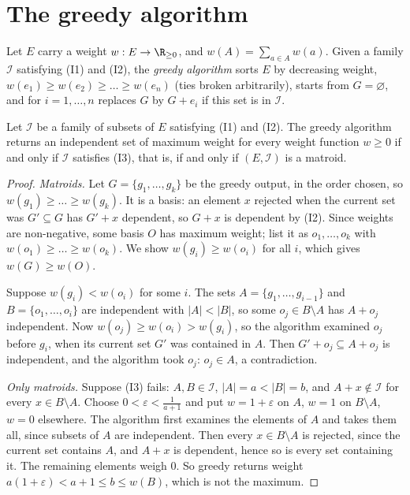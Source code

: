 \section{The greedy algorithm}

Let $E$ carry a weight $w:E\to\R_{\ge0}$, and $w(A)=\sum_{a\in A}w(a)$. Given a family $\mathcal I$ satisfying (I1) and (I2), the \emph{greedy algorithm} sorts $E$ by decreasing weight,
$w(e_1)\ge w(e_2)\ge\dots\ge w(e_n)$ (ties broken arbitrarily), starts from $G=\varnothing$, and for $i=1,\dots,n$ replaces $G$ by $G+e_i$ if this set is in $\mathcal I$.

\begin{theorem}\label{thm:greedy}
Let $\mathcal I$ be a family of subsets of $E$ satisfying (I1) and (I2). The greedy algorithm returns an independent set of maximum weight for every weight function $w\ge0$ if and only if $\mathcal I$ satisfies
(I3), that is, if and only if $(E,\mathcal I)$ is a matroid.
\end{theorem}
\begin{proof}
\emph{Matroids.} Let $G=\{g_1,\dots,g_k\}$ be the greedy output, in the order chosen, so $w(g_1)\ge\dots\ge w(g_k)$. It is a basis: an element $x$ rejected when the current set was $G'\subseteq G$ has $G'+x$
dependent, so $G+x$ is dependent by (I2). Since weights are non-negative, some basis $O$ has maximum weight; list it as $o_1,\dots,o_k$ with $w(o_1)\ge\dots\ge w(o_k)$. We show $w(g_i)\ge w(o_i)$ for all $i$, which gives
$w(G)\ge w(O)$.

Suppose $w(g_i)<w(o_i)$ for some $i$. The sets $A=\{g_1,\dots,g_{i-1}\}$ and $B=\{o_1,\dots,o_i\}$ are independent with $|A|<|B|$, so some $o_j\in B\setminus A$ has $A+o_j$ independent. Now $w(o_j)\ge w(o_i)>w(g_i)$, so the
algorithm examined $o_j$ before $g_i$, when its current set $G'$ was contained in $A$. Then $G'+o_j\subseteq A+o_j$ is independent, and the algorithm took $o_j$: $o_j\in A$, a contradiction.

\emph{Only matroids.} Suppose (I3) fails: $A,B\in\mathcal I$, $|A|=a<|B|=b$, and $A+x\notin\mathcal I$ for every $x\in B\setminus A$. Choose $0<\varepsilon<\frac1{a+1}$ and put $w=1+\varepsilon$ on $A$, $w=1$ on $B\setminus A$, $w=0$ elsewhere.
The algorithm first examines the elements of $A$ and takes them all, since subsets of $A$ are independent. Then every $x\in B\setminus A$ is rejected, since the current set contains $A$, and $A+x$ is dependent,
hence so is every set containing it. The remaining elements weigh $0$. So greedy returns weight $a(1+\varepsilon)<a+1\le b\le w(B)$, which is not the maximum.
\end{proof}

